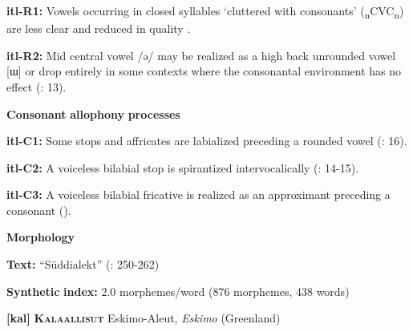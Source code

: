 \documentclass[output=paper]{langsci/langscibook}
\begin{document}
\begin{styleBody}
\textbf{itl-R1:} Vowels occurring in closed syllables ‘cluttered with consonants’ (\textsubscript{n}CVC\textsubscript{n}) are less clear and reduced in quality \citep[73]{Volodin1976}.
\end{styleBody}

\begin{styleBody}
\textbf{itl-R2:} Mid central vowel /ə/ may be realized as a high back unrounded vowel [ɯ] or drop entirely in some contexts where the consonantal environment has no effect (\citealt{GeorgVolodin1999}: 13).
\end{styleBody}

\begin{styleBody}
\textbf{Consonant} \textbf{allophony} \textbf{processes}
\end{styleBody}

\begin{styleBody}
\textbf{itl-C1:} Some stops and affricates are labialized preceding a rounded vowel (\citealt{GeorgVolodin1999}: 16).
\end{styleBody}

\begin{styleBody}
\textbf{itl-C2:} A voiceless bilabial stop is spirantized intervocalically (\citealt{GeorgVolodin1999}: 14-15).
\end{styleBody}

\begin{styleBody}
\textbf{itl-C3:} A voiceless bilabial fricative is realized as an approximant preceding a consonant (\citealt{GeorgVolodin1999}).
\end{styleBody}

\begin{styleBody}
\textbf{Morphology}
\end{styleBody}

\begin{styleBody}
\textbf{Text:} “Süddialekt” (\citealt{GeorgVolodin1999}: 250-262)
\end{styleBody}

\begin{styleBody}
\textbf{Synthetic} \textbf{index:} 2.0 morphemes/word (876 morphemes, 438 words)
\end{styleBody}

\begin{styleBody}
\textbf{[kal]}   \textbf{\textsc{Kalaallisut}}    Eskimo-Aleut, \textit{Eskimo} (Greenland)
\end{styleBody}
\end{document}
